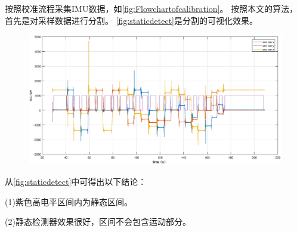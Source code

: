 \documentclass[
  type=master
]{gdutthesis}
\begin{document}
按照校准流程采集IMU数据，如\autoref{fig:Flowchartofcalibration}。
按照本文的算法，首先是对采样数据进行分割。
\autoref{fig:staticdetect}是分割的可视化效果。
\begin{figure}[H]
	\centering
	\includegraphics[width=1.0\textwidth]{staticdetect.eps}
	\label{fig:staticdetect}
\end{figure}

从\autoref{fig:staticdetect}中可得出以下结论：

(1)紫色高电平区间内为静态区间。

(2)静态检测器效果很好，区间不会包含运动部分。
\end{document}
